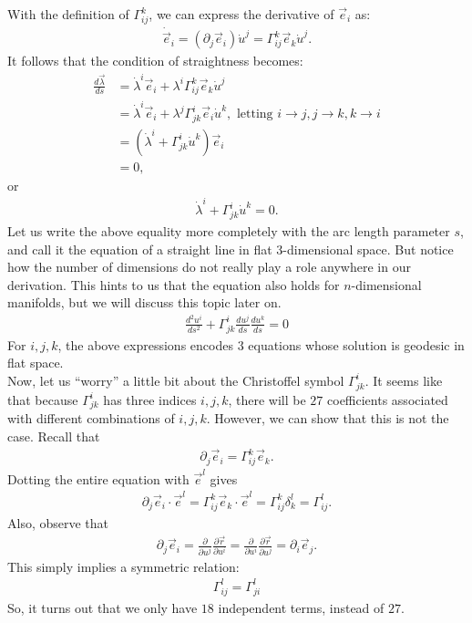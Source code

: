 \documentclass{article}
\theoremstyle{definition}
\begin{document}
With the definition of $\Gamma^{k}_{ij}$, we can express the derivative of $\vec{e}_i$ as:
\begin{align*}
\dot{\vec{e}}_i = \left(\partial_j\vec{e}_i \right)\dot{u}^j = \Gamma^{k}_{ij}\vec{e}_k\dot{u}^j. 
\end{align*}
It follows that the condition of straightness becomes:
\begin{align*}
\frac{d\vec{\lambda}}{ds} &= \dot{\lambda}^i\vec{e}_i + \lambda^i \Gamma^{k}_{ij}\vec{e}_k\dot{u}^j\\
&= \dot{\lambda}^i\vec{e}_i + \lambda^j \Gamma^{i}_{jk}\vec{e}_i\dot{u}^k, \text{ letting $i\rightarrow j, j\rightarrow k, k \rightarrow i$}\\
&= \left(\dot{\lambda}^i + \Gamma^{i}_{jk}\dot{u}^k \right)\vec{e}_i\\
&= 0, 
\end{align*}
or
\begin{align*}
\dot{\lambda}^i + \Gamma^{i}_{jk}\dot{u}^k = 0.
\end{align*}
Let us write the above equality more completely with the arc length parameter $s$, and call it the equation of a straight line in flat 3-dimensional space. But notice how the number of dimensions do not really play a role anywhere in our derivation. This hints to us that the equation also holds for $n$-dimensional manifolds, but we will discuss this topic later on.
\begin{align*}
\boxed{\frac{d^2u^i}{ds^2} + \Gamma^{i}_{jk}\frac{du^j}{ds}\frac{du^k}{ds} = 0}
\end{align*}
For $i,j,k$, the above expressions encodes $3$ equations whose solution is geodesic in flat space.\\ 

Now, let us ``worry'' a little bit about the Christoffel symbol $\Gamma^{i}_{jk}$. It seems like that because $\Gamma^{i}_{jk}$ has three indices $i,j,k$, there will be $27$ coefficients associated with different combinations of $i,j,k$. However, we can show that this is not the case. Recall that
\begin{align*}
\partial_j \vec{e}_i = \Gamma^{k}_{ij}\vec{e}_k.
\end{align*}
Dotting the entire equation with $\vec{e}^l$ gives
\begin{align*}
\partial_j \vec{e}_i\cdot\vec{e}^l = \Gamma^{k}_{ij}\vec{e}_k\cdot\vec{e}^l = \Gamma^{k}_{ij}\delta^l_k = \Gamma^{l}_{ij}.
\end{align*}
Also, observe that 
\begin{align*}
\partial_j\vec{e}_i = \frac{\partial }{\partial u^j}\frac{\partial \vec{r}}{\partial u^i} = \frac{\partial }{\partial u^i}\frac{\partial \vec{r}}{\partial u^j} = \partial_i\vec{e}_j.
\end{align*}
This simply implies a symmetric relation:
\begin{align*}
\boxed{\Gamma^{l}_{ij} = \Gamma^{l}_{ji}}
\end{align*}
So, it turns out that we only  have $18$ independent terms, instead of $27$.\\
\end{document}
